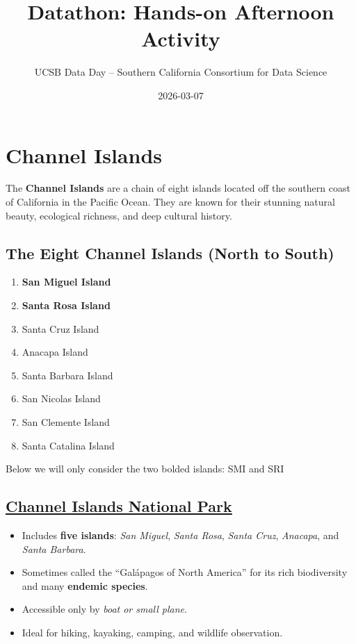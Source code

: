\documentclass[
  letterpaper,
]{report}
\title{Datathon: Hands-on Afternoon Activity}
\author{UCSB Data Day -- Southern California Consortium for Data
Science}
\date{2026-03-07}
\providecommand{\tightlist}{%
  \setlength{\itemsep}{0pt}\setlength{\parskip}{0pt}}\usepackage{longtable,booktabs,array}
\begin{document}
\maketitle


\section{Channel Islands}\label{channel-islands}

The \textbf{Channel Islands} are a chain of eight islands located off
the southern coast of California in the Pacific Ocean. They are known
for their stunning natural beauty, ecological richness, and deep
cultural history.

\subsection{The Eight Channel Islands (North to
South)}\label{the-eight-channel-islands-north-to-south}

\begin{enumerate}
\def\labelenumi{\arabic{enumi}.}
\item
  \textbf{San Miguel Island}
\item
  \textbf{Santa Rosa Island}
\item
  Santa Cruz Island
\item
  Anacapa Island
\item
  Santa Barbara Island
\item
  San Nicolas Island
\item
  San Clemente Island
\item
  Santa Catalina Island
\end{enumerate}

Below we will only consider the two bolded islands: SMI and SRI

\subsection{\texorpdfstring{\href{https://www.nps.gov/chis/index.htm}{Channel
Islands National
Park}}{Channel Islands National Park}}\label{channel-islands-national-park}

\begin{itemize}
\tightlist
\item
  Includes \textbf{five islands}: \emph{San Miguel}, \emph{Santa Rosa},
  \emph{Santa Cruz}, \emph{Anacapa}, and \emph{Santa Barbara}.
\item
  Sometimes called the ``Galápagos of North America'' for its rich
  biodiversity and many \textbf{endemic species}.
\item
  Accessible only by \emph{boat or small plane}.
\item
  Ideal for hiking, kayaking, camping, and wildlife observation.
\end{itemize}
\end{document}
